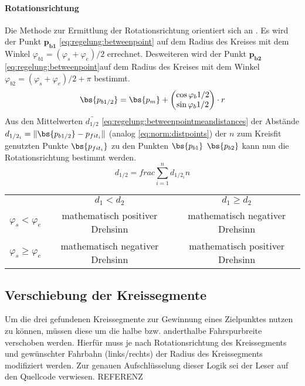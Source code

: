\paragraph{Rotationsrichtung}
Die Methode zur Ermittlung der Rotationsrichtung orientiert sich an \autocite{drauschkeEchtzeitfaehigeStartpunktalgorithmenFuer2016}. Es wird der Punkt \(\boldsymbol{p_{b1}}\) \eqref{eq:regelung:betweenpoint} auf dem Radius des Kreises mit dem Winkel \(  \varphi_{b1} = (\varphi_s + \varphi_e)/2 \) errechnet.
Desweiteren wird der Punkt \(\boldsymbol{p_{b2}}\) \eqref{eq:regelung:betweenpoint}auf dem Radius des Kreises mit dem Winkel \(  \varphi_{b2} = (\varphi_s + \varphi_e)/2 + \pi \) bestimmt.
\begin{equation} \label{eq:regelung:betweenpoint}
\bs{p_{b1/2}} = \bs{p_m} + 
\begin{pmatrix}
\cos{\varphi_b1/2} \\
\sin{\varphi_b1/2}
\end{pmatrix}
\cdot r
\end{equation}
Aus den Mittelwerten \( \bar{d_{1/2}} \) \eqref{eq:regelung:betweenpointmeandistances} der Abstände \( d_{1/2_i} = \| \bs{p_{b1/2}} - p_{fit_i}\| \) (analog \ref{eq:norm:distpoints}) der \(n\) zum Kreisfit genutzten Punkte \(\bs{p_{fit_i}}\) zu den Punkten \(\bs{p_{b1}}\) \(\bs{p_{b2}}\) kann nun die Rotationsrichtung bestimmt werden.
\begin{equation} \label{eq:regelung:betweenpointmeandistances}
d_{1/2} = frac{\sum_{i=1}^n d_{1/2_i}}{n} 
\end{equation}
\begin{tabular}{ccc}
& \(d_1<d_2\) & \(d_1\geq d_2\) \\
\(\varphi_s<\varphi_e\) &  mathematisch positiver Drehsinn & mathematisch negativer Drehsinn \\
\(\varphi_s\geq \varphi_e\) &  mathematisch negativer Drehsinn & mathematisch positiver Drehsinn
\end{tabular}

\subsection{Verschiebung der Kreissegmente}
Um die drei gefundenen Kreissegmente zur Gewinnung eines Zielpunktes nutzen zu können, müssen diese um die halbe bzw. anderthalbe Fahrspurbreite verschoben werden. Hierfür muss je nach Rotationsrichtung des Kreissegments und gewünschter Fahrbahn (links/rechts) der Radius des Kreissegments modifiziert werden. Zur genauen Aufschlüsselung dieser Logik sei der Leser auf den Quellcode verwiesen. REFERENZ

